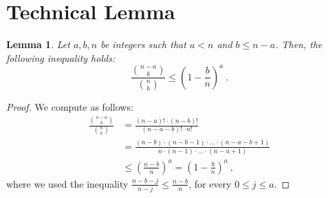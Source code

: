 \documentclass[11pt,a4paper]{article}
\newtheorem{lemma}{Lemma}
\begin{document}





\appendix 

\section{Technical Lemma}
\begin{lemma}\label{lem:tech}
    Let $a,b,n$ be integers such that $a < n$ and $b \le n - a$. Then, the following inequality holds:
    $$\frac{ {n - a \choose b}}{{n \choose b}} \le \left(1 - \frac{b}{n} \right)^a \ .$$
\end{lemma}
\begin{proof}
We compute as follows:
    \begin{align*}
       \frac{ {n - a \choose b}}{{n \choose b}} & = \frac{(n-a)! \cdot (n-b)!}{(n-a-b)! \cdot n!} \\
       & = \frac{(n-b) \cdot (n-b-1) \cdot \ldots \cdot (n-a-b+1)}{n \cdot (n-1) \cdot \ldots \cdot (n-a+1)} \\
       & \le \left( \frac{n-b}{n} \right)^{a} = \left( 1 - \frac{b}{n} \right)^a \ ,
    \end{align*}
    where we used the inequality $\frac{n-b-j}{n-j} \le \frac{n-b}{n}$, for every $0 \le j \le a$.
\end{proof}
\end{document}

